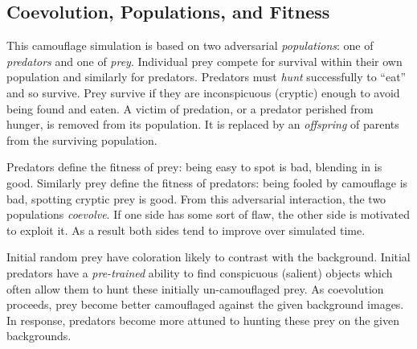 \documentclass[acmtog,
    anonymous,
    review
    ]{acmart}
\newcommand{\jargon}[1]{\textit{#1}}
\begin{document}
\subsection{Coevolution, Populations, and Fitness}
This camouflage simulation is based on two adversarial \jargon{populations}: one of \jargon{predators} and one of \jargon{prey}. Individual prey compete for survival within their own population and similarly for predators. Predators must \jargon{hunt} successfully to “eat” and so survive. Prey survive if they are inconspicuous (cryptic) enough to avoid being found and eaten. A victim of predation, or a predator perished from hunger, is removed from its population. It is replaced by an \jargon{offspring} of parents from the surviving population.
\par
Predators define the fitness of prey: being easy to spot is bad, blending in is good. Similarly prey define the fitness of predators: being fooled by camouflage is bad, spotting cryptic prey is good. From this adversarial interaction, the two populations \jargon{coevolve}. If one side has some sort of flaw, the other side is motivated to exploit it. As a result both sides tend to improve over simulated time.
\par
Initial random prey have coloration likely to contrast with the background. Initial predators have a \jargon{pre-trained} ability to find conspicuous (salient) objects which often allow them to hunt these initially un-camouflaged prey. As coevolution proceeds, prey become better camouflaged against the given background images. In response, predators become more attuned to hunting these prey on the given backgrounds.
\par

\end{document}
